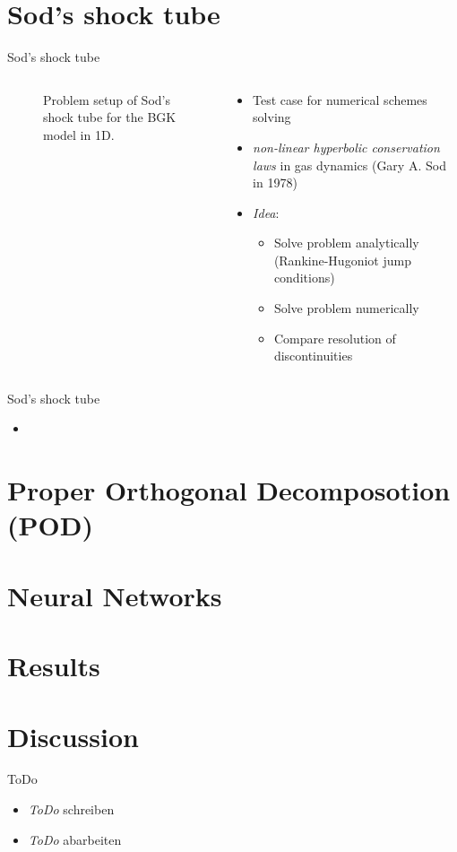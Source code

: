 \documentclass[Nike]{tuberlinbeamer}
\begin{document}
\section{Sod's shock tube}
\begin{frame}[fragile]{Sod's shock tube}
	\begin{columns}
		\begin{column}{.5\textwidth}
				\begin{figure}
					
					\caption{Problem setup of Sod's shock tube for the BGK model in 1D.}
			\end{figure}
		\end{column}
		\begin{column}{.5\textwidth}
				\begin{itemize}
					\item Test case for numerical schemes solving
					\item \emph{non-linear hyperbolic conservation laws} in gas dynamics (Gary A. Sod in 1978)
					\item \emph{Idea}:
					\begin{itemize}
						\item Solve problem analytically (Rankine-Hugoniot jump conditions)
						\item Solve problem numerically
						\item Compare resolution of discontinuities
					\end{itemize}
				\end{itemize}
		\end{column}
	\end{columns}
\end{frame}
\begin{frame}[fragile]{Sod's shock tube}
		\begin{itemize}
			\item 
	\end{itemize}
\end{frame}
\section{Proper Orthogonal Decomposotion (POD)}
\section{Neural Networks}
\section{Results}
\section{Discussion}

\begin{frame}{ToDo}
\begin{itemize}
\item \emph{ToDo} schreiben
\item \emph{ToDo} abarbeiten
\end{itemize}
\end{frame}
\begin{frame}
	\printbibliography
\end{frame}
\end{document}
